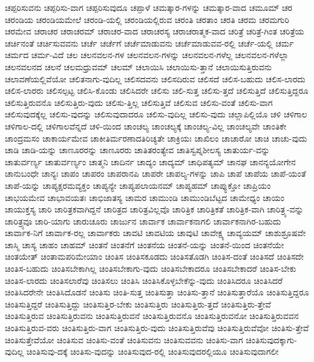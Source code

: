 {ಚಪ್ಪರಿಸುವನು
ಚಪ್ಪರಿಸು-ವಾಗ
ಚಪ್ಪರಿಸುವುದೂ
ಚಪ್ಪಾಳೆ
ಚಮತ್ಕಾರ-ಗಳನ್ನು
ಚಮತ್ಕಾರ-ವಾದ
ಚಮೂಮ್
ಚರ
ಚರಂಡಿಯ
ಚರಂಡಿಯಮೇಲೆ
ಚರಂಡಿ-ಯಲ್ಲಿ
ಚರಂಡಿಯಲ್ಲಿರುವ
ಚರಂತಿ
ಚರತಾಂ
ಚರತಿ
ಚರಮ
ಚರಮಗುರಿ
ಚರಮೇವ
ಚರಾಚರ
ಚರಾಚರಮ್
ಚರಾಚರ-ವಾದ
ಚರಾಚರಸ್ಯ
ಚರಾಚರಾತ್ಮಕ-ವಾದ
ಚರಿತ್ರೆ
ಚರಿತ್ರೆ-ಗಿಂತ
ಚರಿತ್ರೆಯ
ಚರ್ಚಿನಂತೆ
ಚರ್ಚಿಸುವವನು
ಚರ್ಚೆ
ಚರ್ಚೆಗೆ
ಚರ್ಚೆಮಾಡುವನು
ಚರ್ಚೆಮಾಡುವವ-ರಲ್ಲಿ
ಚರ್ಚೆ-ಯಲ್ಲಿ
ಚರ್ಮ
ಚರ್ಮದ
ಚರ್ಮ-ವಿದೆ
ಚಲ
ಚಲನವಲನ-ಗಳ
ಚಲನವಲನ-ಗಳನ್ನು
ಚಲನವಲನ-ಗಳೆಲ್ಲ
ಚಲನವಲನ-ಗಳೆಲ್ಲಾ
ಚಲನವಲನದ
ಚಲನೆ
ಚಲಮಧ್ರುವಮ್
ಚಲಮ್
ಚಲಾಯಿಸಿ
ಚಲಾಯಿಸು-ತ್ತಾನೆ
ಚಲಾಯಿಸುತ್ತಿರುವನು
ಚಲಾವಣೆಯಲ್ಲಿವೆಯೋ
ಚಲಿತನಾಗು-ವುದಿಲ್ಲ
ಚಲಿಸದವನು
ಚಲಿಸದಿರುವ
ಚಲಿಸದೆ
ಚಲಿಸ-ಬಹುದು
ಚಲಿಸ-ಲಾರದು
ಚಲಿಸ-ಲಾರರು
ಚಲಿಸಲ್ಪಟ್ಟ
ಚಲಿಸಿ-ಕೊಂಡು
ಚಲಿಸಿದರೇ
ಚಲಿಸು
ಚಲಿ-ಸುತ್ತ
ಚಲಿಸು-ತ್ತದೆ
ಚಲಿಸುತ್ತಿದೆ
ಚಲಿಸುತ್ತಿದ್ದರೂ
ಚಲಿಸುತ್ತಿರುವನೊ
ಚಲಿಸುತ್ತಿರು-ವುದು
ಚಲಿಸು-ತ್ತಿಲ್ಲ
ಚಲಿಸುತ್ತಿವೆ
ಚಲಿಸುವ
ಚಲಿಸು-ವಂತೆ
ಚಲಿಸು-ವಾಗ
ಚಲಿಸುವುದಕ್ಕೆಲ್ಲ
ಚಲಿಸು-ವುದನ್ನು
ಚಲಿಸುವುದಾದರೂ
ಚಲಿಸು-ವುದಿಲ್ಲ
ಚಲಿಸು-ವುದು
ಚಲ್ಲಾಪಿಲ್ಲಿಯೊ
ಚಳಿ
ಚಳಿಗಾಲ
ಚಳಿಗಾಲ-ದಲ್ಲಿ
ಚಳಿಗಾಲವೆನ್ನದೆ
ಚಳಿ-ಯಿಂದ
ಚಾಂಚಲ್ಯ
ಚಾಂಚಲ್ಯಕ್ಕೆ
ಚಾಂಚಲ್ಯ-ವಿಲ್ಲ
ಚಾಂಚಲ್ಯವೇ
ಚಾಂತಿಕೇ
ಚಾಂದ್ರಮಸಂ
ಚಾಕಾರ್ಯಮೇವ
ಚಾಕೀತಿರ್ಮರಣಾದತಿರಿಚ್ಯತೇ
ಚಾಕ್ರಿಯಃ
ಚಾಖಿಲಂ
ಚಾಚಾರೋ
ಚಾಚಿ
ಚಾಚು-ವುದು
ಚಾಡಿ
ಚಾಡಿ-ಯನ್ನು
ಚಾಣೂರರನ್ನು
ಚಾಣೂರರು
ಚಾತಿತರಂತ್ಯೇವ
ಚಾತಿಸ್ವಪ್ನಶೀಲಸ್ಯ
ಚಾತುರ್ಯ-ವನ್ನು
ಚಾತುರ್ವರ್ಣ್ಯ
ಚಾತುರ್ವರ್ಣ್ಯಂ
ಚಾತ್ಮನಿ
ಚಾದಿರ್ನ
ಚಾದ್ಯಂ
ಚಾದ್ಯಮ್
ಚಾಧಿಪತ್ಯಮ್
ಚಾನಘ
ಚಾನನ್ಯಯೋಗೇನ
ಚಾನುಬಂಧೇ
ಚಾನ್ಯಃ
ಚಾಪಂ
ಚಾಪರಂ
ಚಾಪರಾನಪಿ
ಚಾಪರೇ
ಚಾಪಲ್ಯ-ಗಳನ್ನು
ಚಾಪಿ
ಚಾಪೆ
ಚಾಪೆಯ
ಚಾಪೆ-ಯಂತೆ
ಚಾಪೆ-ಯನ್ನು
ಚಾಪ್ಯಕ್ಷರಮವ್ಯಕ್ತಂ
ಚಾಪ್ಯನ್ಯೇ
ಚಾಪ್ಯಪಲಾಯನಮ್
ಚಾಪ್ಯಹಮ್
ಚಾಪ್ಯುಕ್ತೋ
ಚಾಪ್ರಿಯಂ
ಚಾಭಯಮೇವ
ಚಾಭಾವಯತಃ
ಚಾಭಿಜಾತಸ್ಯ
ಚಾಮರ
ಚಾಮುಂಡಿ
ಚಾಮುಂಡಿಬೆಟ್ಟದ
ಚಾಮೇಧ್ಯಂ
ಚಾಯಂ
ಚಾಯುಕ್ತಸ್ಯ
ಚಾರಿ
ಚಾರಿತ್ರಕವಾಗಿದ್ದನೆ
ಚಾರಿತ್ರದ
ಚಾರಿತ್ರವಿಲ್ಲವೊ
ಚಾರಿತ್ರಿಕ
ಚಾರಿತ್ರಿಕತೆ
ಚಾರಿತ್ರಿಕ-ವಾಗಿ
ಚಾರಿತ್ರ್ಯ-ವನ್ನು
ಚಾರಿತ್ರ್ಯವೂ
ಚಾರಿ-ಯಾಗು
ಚಾರುಚೂರು
ಚಾರ್ಜುನ
ಚಾರ್ವಾಕ
ಚಾರ್ವಾಕನಾಗಲಿ
ಚಾರ್ವಾಕನಾಗಿರ-ಬಹುದು
ಚಾರ್ವಾಕ-ನಿಗೆ
ಚಾರ್ವಾಕ-ರಲ್ಲ
ಚಾರ್ವಾಕರು
ಚಾವಟಿ
ಚಾವಟಿಯ
ಚಾವುಟಿ
ಚಾವೇಕ್ಷ್ಯ
ಚಾವ್ಯಯಮ್
ಚಾಶುಶ್ರೂಷವೇ
ಚಾಸ್ಮಿ
ಚಾಸ್ಯ
ಚಾಹಂ
ಚಾಹಮ್
ಚಿಂತನೆ
ಚಿಂತನೆಗೆ
ಚಿಂತನೆಯ
ಚಿಂತನೆ-ಯನ್ನು
ಚಿಂತನೆ-ಯಿಂದ
ಚಿಂತನೆಯೇ
ಚಿಂತಯೇತ್
ಚಿಂತಾಮಪರಿಮೇಯಾಂ
ಚಿಂತಿಸ
ಚಿಂತಿಸಕೂಡದು
ಚಿಂತಿಸತೊಡಗಿ
ಚಿಂತಿಸ-ದಂತೆ
ಚಿಂತಿಸದೆ
ಚಿಂತಿಸದೇ
ಚಿಂತಿಸ-ಬಹುದು
ಚಿಂತಿಸಬೇಕಾಗಿಲ್ಲ
ಚಿಂತಿಸಬೇಕಾಗು-ವುದು
ಚಿಂತಿಸಬೇಕಾದರೂ
ಚಿಂತಿಸಬೇಕಾದರೆ
ಚಿಂತಿಸ-ಬೇಕು
ಚಿಂತಿಸ-ಲಾರದು
ಚಿಂತಿಸಲಾರೆವು
ಚಿಂತಿಸಲು
ಚಿಂತಿಸಿ
ಚಿಂತಿಸಿಕೊಳ್ಳಬೇಕೆನ್ನು-ವುದು
ಚಿಂತಿಸಿದರೂ
ಚಿಂತಿಸಿದರೆ
ಚಿಂತಿಸಿದರೇನೇ
ಚಿಂತಿಸಿದೊಡನೆ
ಚಿಂತಿಸು
ಚಿಂತಿ-ಸುತ್ತ
ಚಿಂತಿಸುತ್ತಾ
ಚಿಂತಿಸು-ತ್ತಾನೆ
ಚಿಂತಿಸುತ್ತಾರೆಯೊ
ಚಿಂತಿಸುತ್ತಿದ್ದರೂ
ಚಿಂತಿಸುತ್ತಿದ್ದರೆ
ಚಿಂತಿಸುತ್ತಿದ್ದು
ಚಿಂತಿಸುತ್ತಿರ-ಬೇಕು
ಚಿಂತಿಸುತ್ತಿರು
ಚಿಂತಿಸುತ್ತಿರು-ತ್ತದೆ
ಚಿಂತಿಸುತ್ತಿರು-ತ್ತೇವೆ
ಚಿಂತಿಸುತ್ತಿರುವ
ಚಿಂತಿಸುತ್ತಿರುವನು
ಚಿಂತಿಸುತ್ತಿರುವನೆ
ಚಿಂತಿಸುತ್ತಿರುವನೊ
ಚಿಂತಿಸುತ್ತಿರುವನೋ
ಚಿಂತಿಸುತ್ತಿರುವವನ
ಚಿಂತಿಸುತ್ತಿರುವ-ವರು
ಚಿಂತಿಸುತ್ತಿರು-ವಾಗ
ಚಿಂತಿಸುತ್ತಿರು-ವುದು
ಚಿಂತಿಸುತ್ತಿರುವೆವು
ಚಿಂತಿಸುತ್ತಿರುವೆವೋ
ಚಿಂತಿಸು-ತ್ತೇವೆ
ಚಿಂತಿಸುತ್ತೇವೆಯೋ
ಚಿಂತಿಸುವ
ಚಿಂತಿಸು-ವಂತೆ
ಚಿಂತಿಸುವನು
ಚಿಂತಿಸುವವನು
ಚಿಂತಿಸು-ವಾಗ
ಚಿಂತಿಸುವುದಕ್ಕಾಗು-ವುದಿಲ್ಲ
ಚಿಂತಿಸುವು-ದಕ್ಕೆ
ಚಿಂತಿಸು-ವುದನ್ನು
ಚಿಂತಿಸುವುದ-ರಲ್ಲಿ
ಚಿಂತಿಸುವುದರಲ್ಲಿಯೂ
ಚಿಂತಿಸುವುದಾಗಲೀ
}
